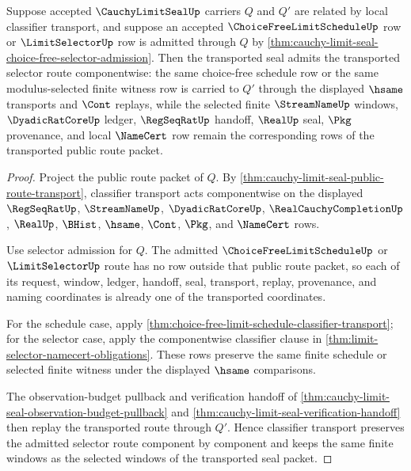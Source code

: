 
\begin{theorem}
\label{thm:cauchy-limit-seal-choice-free-selector-stability}
Suppose accepted $\CauchyLimitSealUp$ carriers $Q$ and $Q'$ are related by local classifier transport, and suppose an accepted $\ChoiceFreeLimitScheduleUp$ row or $\LimitSelectorUp$ row is admitted through $Q$ by \autoref{thm:cauchy-limit-seal-choice-free-selector-admission}. Then the transported seal admits the transported selector route componentwise: the same choice-free schedule row or the same modulus-selected finite witness row is carried to $Q'$ through the displayed $\hsame$ transports and $\Cont$ replays, while the selected finite $\StreamNameUp$ windows, $\DyadicRatCoreUp$ ledger, $\RegSeqRatUp$ handoff, $\RealUp$ seal, $\Pkg$ provenance, and local $\NameCert$ row remain the corresponding rows of the transported public route packet.
\end{theorem}
\begin{proof}
Project the public route packet of $Q$. By \autoref{thm:cauchy-limit-seal-public-route-transport}, classifier transport acts componentwise on the displayed $\RegSeqRatUp$, $\StreamNameUp$, $\DyadicRatCoreUp$, $\RealCauchyCompletionUp$, $\RealUp$, $\BHist$, $\hsame$, $\Cont$, $\Pkg$, and $\NameCert$ rows.

Use selector admission for $Q$. The admitted $\ChoiceFreeLimitScheduleUp$ or $\LimitSelectorUp$ route has no row outside that public route packet, so each of its request, window, ledger, handoff, seal, transport, replay, provenance, and naming coordinates is already one of the transported coordinates.

For the schedule case, apply \autoref{thm:choice-free-limit-schedule-classifier-transport}; for the selector case, apply the componentwise classifier clause in \autoref{thm:limit-selector-namecert-obligations}. These rows preserve the same finite schedule or selected finite witness under the displayed $\hsame$ comparisons.

The observation-budget pullback and verification handoff of \autoref{thm:cauchy-limit-seal-observation-budget-pullback} and \autoref{thm:cauchy-limit-seal-verification-handoff} then replay the transported route through $Q'$. Hence classifier transport preserves the admitted selector route component by component and keeps the same finite windows as the selected windows of the transported seal packet.
\end{proof}

